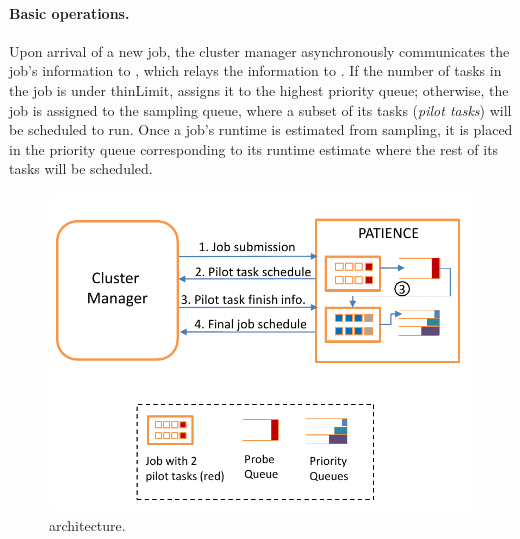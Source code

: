 \paragraph{Basic operations.}
Upon arrival of a new job, the cluster manager asynchronously communicates
the job's information to \gs, which relays the information to \slearn.  If the
number of tasks in the job is under thinLimit, \slearn assigns it
to the highest priority queue; otherwise, the job is assigned to the
sampling queue, where a subset of its tasks (\textit{pilot tasks}) will be scheduled to run.
Once a job's runtime is estimated from sampling, it is placed in the
priority queue corresponding to its runtime estimate where the rest of its tasks
will be scheduled.

\begin{figure}[tp]
  \centering
  \includegraphics[page=2, width=0.95\linewidth]{figures/others/arch.pdf}
  \caption{\name architecture.}
  \label{fig:design:arch}
	\vspace{-0.1in}
\end{figure}
\fi

